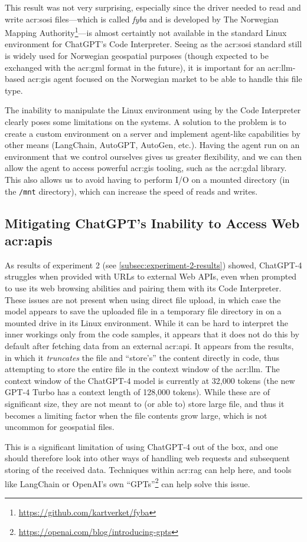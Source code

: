 This result was not very surprising, especially since the driver needed to read and write \acrshort{acr:sosi} files---which is called \textit{fyba} and is developed by The Norwegian Mapping Authority\footnote{\url{https://github.com/kartverket/fyba}}---is almost certaintly not available in the standard Linux environment for ChatGPT's Code Interpreter. Seeing as the \acrshort{acr:sosi} standard still is widely used for Norwegian geospatial purposes (though expected to be exchanged with the \acrshort{acr:gml} format in the future), it is important for an \acrshort{acr:llm}-based \acrshort{acr:gis} agent focused on the Norwegian market to be able to handle this file type.

The inability to manipulate the Linux environment using by the Code Interpreter clearly poses some limitations on the systems. A solution to the problem is to create a custom environment on a server and implement agent-like capabilities by other means (LangChain, AutoGPT, AutoGen, etc.). Having the agent run on an environment that we control ourselves gives us greater flexibility, and we can then allow the agent to access powerful \acrshort{acr:gis} tooling, such as the \acrshort{acr:gdal} library. This also allows us to avoid having to perform I/O on a mounted directory (in the \texttt{/mnt} directory), which can increase the speed of reads and writes.

\subsection[Mitigating ChatGPT's Inability to Access Web APIs]{Mitigating ChatGPT's Inability to Access Web \acrshort{acr:api}s}

As results of experiment 2 (see \autoref{subsec:experiment-2-results}) showed, ChatGPT-4 struggles when provided with URLs to external Web APIs, even when prompted to use its web browsing abilities and pairing them with its Code Interpreter. These issues are not present when using direct file upload, in which case the model appears to save the uploaded file in a temporary file directory in on a mounted drive in its Linux environment. While it can be hard to interpret the inner workings only from the code samples, it appears that it does not do this by default after fetching data from an external \acrshort{acr:api}. It appears from the results, in which it \textit{truncates} the file and \enquote{store's} the content directly in code, thus attempting to store the entire file in the context window of the  \acrshort{acr:llm}. The context window of the ChatGPT-4 model is currently at 32,000 tokens (the new GPT-4 Turbo has a context length of 128,000 tokens). While these are of significant size, they are not meant to (or able to) store large file, and thus it becomes a limiting factor when the file contents grow large, which is not uncommon for geospatial files.

This is a significant limitation of using ChatGPT-4 out of the box, and one should therefore look into other ways of handling web requests and subsequent storing of the received data. Techniques within \gls{acr:rag} can help here, and tools like LangChain or OpenAI's own \enquote{GPTs}\footnote{\url{https://openai.com/blog/introducing-gpts}} can help solve this issue.

\glsaddall